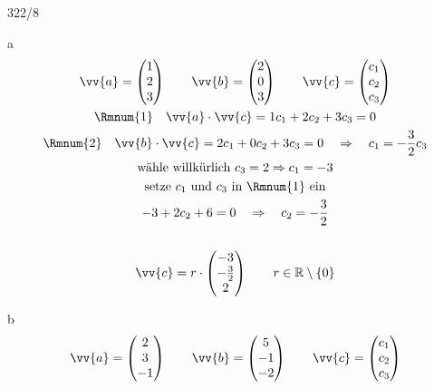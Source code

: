 \begin{exercise}{322/8}
  \item [a]
  \begin{gather*}
    \vv{a} = \begin{pmatrix}1 \\ 2 \\ 3\end{pmatrix} \qquad \vv{b} = \begin{pmatrix}2 \\ 0 \\ 3\end{pmatrix} \qquad \vv{c} = \begin{pmatrix}c_1 \\ c_2 \\ c_3\end{pmatrix} \\
    \text{\Rmnum{1}} \quad \vv{a} \cdot \vv{c} = 1c_1 + 2c_2 + 3c_3 = 0 \\
    \text{\Rmnum{2}} \quad \vv{b} \cdot \vv{c} = 2c_1 + 0c_2 + 3c_3 = 0 \quad\Rightarrow\quad c_1 = -\frac{3}{2}c_3 \\
    \text{wähle willkürlich } c_3 = 2 \Rightarrow c_1 = -3 \\
    \text{setze $c_1$ und $c_3$ in \Rmnum{1} ein} \\
    -3 + 2c_2 + 6 = 0 \quad\Rightarrow\quad c_2 = -\frac{3}{2} \\\\
    \vv{c} = r \cdot \begin{pmatrix}-3 \\ -\frac{3}{2} \\ 2\end{pmatrix} \qquad r \in \mathbb{R} \setminus \{0\}
  \end{gather*}
  \item [b]
  \begin{gather*}
    \vv{a} = \begin{pmatrix}2 \\ 3 \\ -1\end{pmatrix} \qquad \vv{b} = \begin{pmatrix}5 \\ -1 \\ -2\end{pmatrix} \qquad \vv{c} = \begin{pmatrix}c_1 \\ c_2 \\ c_3\end{pmatrix} \\

\end{gather*}
\end{exercise}
